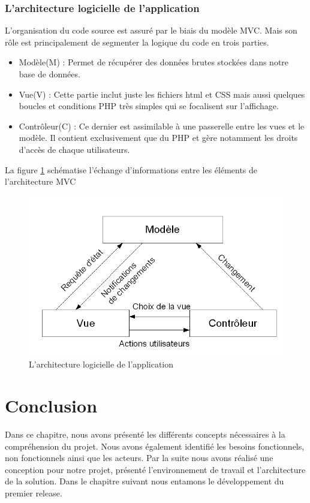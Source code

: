 \subsubsection{L'architecture  logicielle de l’application}
L’organisation du code source est assuré par le biais du modèle MVC. Mais son rôle est principalement de segmenter la logique du code en trois parties. 
\begin{itemize}
	\item Modèle(M) : Permet de récupérer des données brutes stockées dans notre base de données.
	\item Vue(V) : Cette partie inclut juste les fichiers html et CSS mais aussi quelques boucles et conditions PHP très simples qui se focalisent sur l’affichage. 
	\item Contrôleur(C) : Ce dernier est assimilable à une passerelle entre les vues et le modèle. Il contient exclusivement que du PHP et gère notamment les droits d’accès de chaque utilisateurs. 
\end{itemize}
La figure \ref{fig:mvc} schématise l’échange d’informations entre les éléments de l’architecture MVC
\begin{figure}[H]
	\centering
	\includegraphics[width=0.7\linewidth]{img/mvc}
	\caption[L'architecture logicielle de l’application]{L'architecture logicielle de l’application}
	\label{fig:mvc}
\end{figure}

\section*{Conclusion}
Dans ce chapitre, nous avons présenté les différents concepts nécessaires à la compréhension du projet. Nous avons également identifié les besoins fonctionnels, non fonctionnels ainsi que les acteurs. Par la suite nous avons réalisé une conception pour notre projet, présenté l’environnement de travail et l’architecture de la solution. Dans le chapitre suivant nous entamons le développement du premier release.